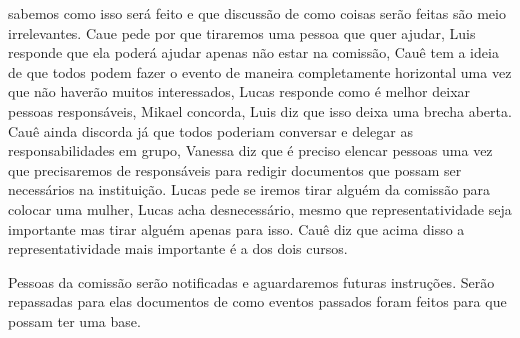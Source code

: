 \documentclass{ata-calico}
\begin{document}
sabemos como isso será feito e que discussão de como coisas serão feitas são
meio irrelevantes. Caue pede por que tiraremos uma pessoa que quer ajudar, Luis
responde que ela poderá ajudar apenas não estar na comissão, Cauê tem a ideia
de que todos podem fazer o evento de maneira completamente horizontal uma vez
que não haverão muitos interessados, Lucas responde como é melhor deixar
pessoas responsáveis, Mikael concorda, Luis diz que isso deixa uma brecha
aberta. Cauê ainda discorda já que todos poderiam conversar e delegar as
responsabilidades em grupo, Vanessa diz que é preciso elencar pessoas uma vez
que precisaremos de responsáveis para redigir documentos que possam ser
necessários na instituição. Lucas pede se iremos tirar alguém da comissão para
colocar uma mulher, Lucas acha desnecessário, mesmo que representatividade seja
importante mas tirar alguém apenas para isso. Cauê diz que acima disso a
representatividade mais importante é a dos dois cursos.

Pessoas da comissão serão notificadas e aguardaremos futuras instruções. Serão
repassadas para elas documentos de como eventos passados foram feitos para que
possam ter uma base.
\end{document}
